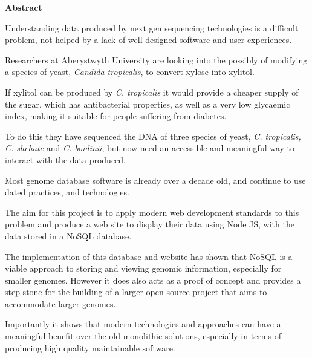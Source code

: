 \thispagestyle{empty}

\begin{center}
    {\LARGE\bf Abstract}
\end{center}

Understanding data produced by next gen sequencing technologies is a difficult problem, not helped by a lack of well designed software and user experiences. 

Researchers at Aberystwyth University are looking into the possibly of modifying a species of yeast, \textit{Candida tropicalis}, to convert xylose into xylitol. 

If xylitol can be produced by \textit{C. tropicalis} it would provide a cheaper supply of the sugar, which has antibacterial properties, as well as a very low glycaemic index, making it suitable for people suffering from diabetes.

To do this they have sequenced the DNA of three species of yeast, \textit{C. tropicalis, C. shehate} and \textit{C. boidinii}, but now need an accessible and meaningful way to interact with the data produced.

Most genome database software is already over a decade old, and continue to use dated practices, and technologies. 

The aim for this project is to apply modern web development standards to this problem and produce a web site to display their data using Node JS, with the data stored in a NoSQL database. 

The implementation of this database and website has shown that NoSQL is a viable approach to storing and viewing genomic information, especially for smaller genomes. However it does also acts as a proof of concept and provides a step stone for the building of a larger open source project that aims to accommodate larger genomes. 

Importantly it shows that modern technologies and approaches can have a meaningful benefit over the old monolithic solutions, especially in terms of producing high quality maintainable software.
